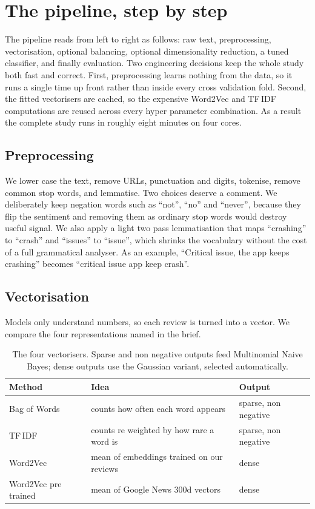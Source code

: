 \documentclass[11pt,a4paper]{article}
\begin{document}
\section{The pipeline, step by step}
The pipeline reads from left to right as follows: raw text, preprocessing,
vectorisation, optional balancing, optional dimensionality reduction, a tuned
classifier, and finally evaluation. Two engineering decisions keep the whole study
both fast and correct. First, preprocessing learns nothing from the data, so it runs
a single time up front rather than inside every cross validation fold. Second, the
fitted vectorisers are cached, so the expensive Word2Vec and TF\,IDF computations are
reused across every hyper parameter combination. As a result the complete study runs
in roughly eight minutes on four cores.

\subsection{Preprocessing}
We lower case the text, remove URLs, punctuation and digits, tokenise, remove common
stop words, and lemmatise. Two choices deserve a comment. We deliberately keep
negation words such as ``not'', ``no'' and ``never'', because they flip the sentiment
and removing them as ordinary stop words would destroy useful signal. We also apply a
light two pass lemmatisation that maps ``crashing'' to ``crash'' and ``issues'' to
``issue'', which shrinks the vocabulary without the cost of a full grammatical
analyser. As an example, ``Critical issue, the app keeps crashing'' becomes ``critical
issue app keep crash''.

\subsection{Vectorisation}
Models only understand numbers, so each review is turned into a vector. We compare the
four representations named in the brief.

\begin{table}[H]
\centering
\begin{tabular}{lll}
\toprule
\textbf{Method} & \textbf{Idea} & \textbf{Output} \\
\midrule
Bag of Words & counts how often each word appears & sparse, non negative \\
TF\,IDF & counts re weighted by how rare a word is & sparse, non negative \\
Word2Vec & mean of embeddings trained on our reviews & dense \\
Word2Vec pre trained & mean of Google News 300d vectors & dense \\
\bottomrule
\end{tabular}
\caption{The four vectorisers. Sparse and non negative outputs feed Multinomial Naive
Bayes; dense outputs use the Gaussian variant, selected automatically.}
\end{table}
\end{document}

